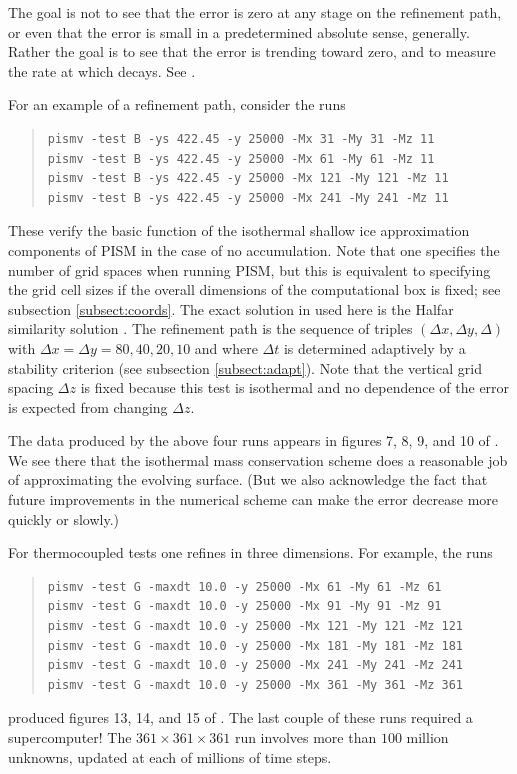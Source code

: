 \documentclass[11pt,final]{amsart}
\begin{document}
The goal is not to see that the error is zero at any stage on the refinement path, or even that the error is small in a predetermined absolute sense, generally.  Rather the goal is to see that the error is trending toward zero, and to measure the rate at which decays.  See \cite{BLKCB,BBL,Roache,Wesseling}.

For an example of a refinement path, consider the runs
\begin{quote}\small\begin{verbatim}
pismv -test B -ys 422.45 -y 25000 -Mx 31 -My 31 -Mz 11
pismv -test B -ys 422.45 -y 25000 -Mx 61 -My 61 -Mz 11
pismv -test B -ys 422.45 -y 25000 -Mx 121 -My 121 -Mz 11
pismv -test B -ys 422.45 -y 25000 -Mx 241 -My 241 -Mz 11
\end{verbatim}
\normalsize\end{quote}
These verify the basic function of the isothermal shallow ice approximation components of PISM in the case of no accumulation.  Note that one specifies the number of grid spaces when running PISM, but this is equivalent to specifying the grid cell sizes if the overall dimensions of the computational box is fixed; see subsection \ref{subsect:coords}.  The exact solution in used here is the Halfar similarity solution \cite{Halfar83}.  The refinement path is the sequence of triples $(\Delta x,\Delta y,\Delta)$ with $\Delta x = \Delta y = 80,40,20,10$ and where $\Delta t$ is determined adaptively by a stability criterion (see subsection \ref{subsect:adapt}).  Note that the vertical grid spacing $\Delta z$ is fixed because this test is isothermal and no dependence of the error is expected from changing $\Delta z$.

The data produced by the above four runs appears in figures 7, 8, 9, and 10 of \cite{BLKCB}.  We see there that the isothermal mass conservation scheme does a reasonable job of approximating the evolving surface.  (But we also acknowledge the fact that future improvements in the numerical scheme can make the error decrease more quickly or slowly.)

For thermocoupled tests one refines in three dimensions.  For example, the runs
\begin{quote}\small\begin{verbatim}
pismv -test G -maxdt 10.0 -y 25000 -Mx 61 -My 61 -Mz 61
pismv -test G -maxdt 10.0 -y 25000 -Mx 91 -My 91 -Mz 91
pismv -test G -maxdt 10.0 -y 25000 -Mx 121 -My 121 -Mz 121
pismv -test G -maxdt 10.0 -y 25000 -Mx 181 -My 181 -Mz 181
pismv -test G -maxdt 10.0 -y 25000 -Mx 241 -My 241 -Mz 241
pismv -test G -maxdt 10.0 -y 25000 -Mx 361 -My 361 -Mz 361
\end{verbatim}
\normalsize\end{quote}
produced figures 13, 14, and 15 of \cite{BBL}.  The last couple of these runs required a supercomputer!  The $361\times 361\times 361$ run involves more than $100$ million unknowns, updated at each of millions of time steps.
\end{document}

